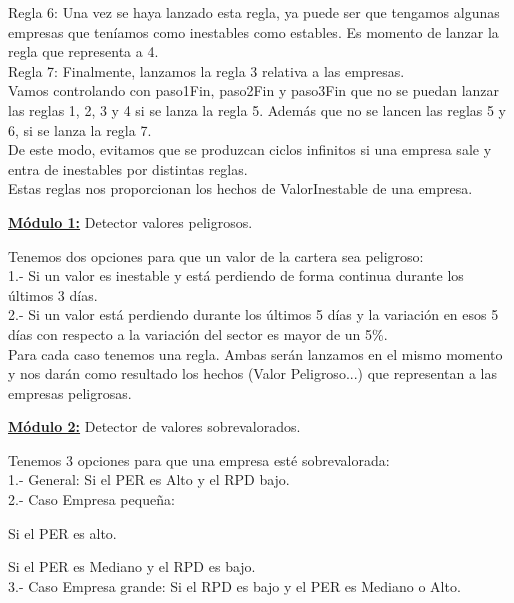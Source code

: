 \documentclass[12pt]{article}
\begin{document}
Regla 6: Una vez se haya lanzado esta regla, ya puede ser que tengamos algunas empresas que teníamos como inestables como estables. Es momento de lanzar la regla que representa a 4. \\

Regla 7: Finalmente, lanzamos la regla 3 relativa a las empresas. \\

Vamos controlando con paso1Fin, paso2Fin y paso3Fin que no se puedan lanzar las reglas 1, 2, 3 y 4 si se lanza la regla 5. Además que no se lancen las reglas 5 y 6, si se lanza la regla 7. \\
De este modo, evitamos que se produzcan ciclos infinitos si una empresa sale y entra de inestables por distintas reglas.   \\

Estas reglas nos proporcionan los hechos de ValorInestable de una empresa. \\


\begin{center}
	\underline{\textbf{Módulo 1:}} Detector valores peligrosos.
\end{center}

Tenemos dos opciones para que un valor de la cartera sea peligroso:\\
1.- Si un valor es inestable y está perdiendo de forma continua durante los últimos 3 días.\\
2.- Si un valor está perdiendo durante los últimos 5 días y la variación en esos 5 días con respecto a la variación del sector es mayor de un 5\%. \\

Para cada caso tenemos una regla. Ambas serán lanzamos en el mismo momento y nos darán como resultado los hechos (Valor Peligroso...) que representan a las empresas peligrosas. \\

\begin{center}
	\underline{\textbf{Módulo 2:}} Detector de valores sobrevalorados.
\end{center}
Tenemos 3 opciones para que una empresa esté sobrevalorada:\\
1.- General: Si el PER es Alto y el RPD bajo.\\
2.- Caso Empresa pequeña:

    Si el PER es alto.
    
    Si el PER es Mediano y el RPD es bajo.\\
3.- Caso Empresa grande:
    Si el RPD es bajo y el PER es Mediano o Alto.
    
\end{document}
